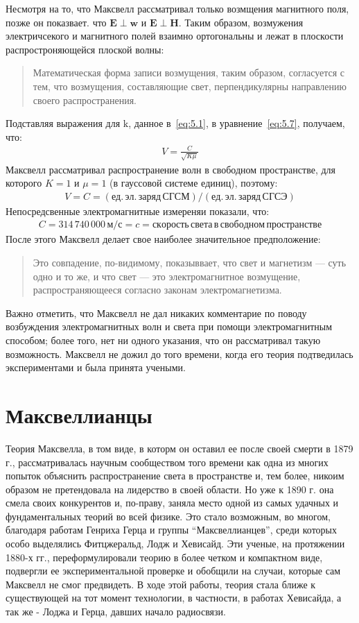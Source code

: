 \documentclass[12pt, oneside, a4paper]{article}
\begin{document}
Несмотря на то, что Максвелл рассматривал только возмщения магнитного поля, позже он показвает. что $\mathbf{E}\perp\mathbf{w}$ и $\mathbf{E}\perp\mathbf{H}$. Таким образом, возмужения электричсекого и магнитного полей  взаимно ортогональны и  лежат в плоскости распростроняющейся плоской волны:
\begin{quote}\small
Математическая форма записи возмущения, таким образом, согласуется с тем, что возмущения, составляющие свет, перпендикулярны направлению своего распространения.
\end{quote}
Подставляя выражения для $\mathrm{k}$, данное в~\eqref{eq:5.1}, в уравнение~\eqref{eq:5.7}, получаем, что:
\begin{align*}
V=\frac{C}{\sqrt{K\mu}}
\end{align*}
Максвелл рассматривал распространение волн в свободном пространстве, для которого $K=1$ и $\mu=1$ (в гауссовой системе единиц), поэтому:
\begin{align*}
V=C=(ед.\,эл.\,заряд\,СГСМ)/(ед.\,эл.\,заряд\,СГСЭ)
\end{align*}
Непосредсвенные электромагнитные измереняи показали, что:
\begin{align*}
C=314\,740\,000\, м/с=c=скорость\,света\,в\,свободном\,пространстве
\end{align*}
После этого Максвелл делает свое наиболее значительное предположение:
\begin{quote}
Это совпадение, по-видимому, показыввает, что свет и магнетизм --- суть одно и то же, и что свет --- это электромагнитное возмущение, распространяющееся согласно законам электромагнетизма.
\end{quote} 

Важно отметить, что Максвелл не дал никаких комментарие по поводу возбуждения электромагнитных волн и света при помощи электромагнитным способом; более того, нет ни одного указания, что он рассматривал такую возможность. Максвелл не дожил до того времени, когда его теория подтведилась экспериментами и была принята учеными. 
\section*{Максвеллианцы}
Теория Максвелла, в том виде, в которм он оставил ее после своей смерти в 1879 г., рассматривалась научным сообществом того времени как одна из многих попыток объяснить распространение света в пространстве и, тем более, никоим образом не претендовала на лидерство в своей области. Но уже к 1890 г. она смела своих конкурентов и, по-праву, заняла место одной из самых удачных и фундаментальных теорий во всей физике. Это стало возможным, во многом, благодаря работам Генриха Герца и группы ``Максвеллианцев'', среди которых особо выделялись Фитцжеральд, Лодж и Хевисайд. Эти ученые, на протяжении 1880-х гг., переформулировали теорию в более четком и компактном виде, подвергли ее экспериментальной проверке  и обобщили на случаи, которые сам Максвелл не смог предвидеть. В ходе этой работы, теория стала ближе к существующей на тот момент технологии, в частности, в работах Хевисайда, а так же - Лоджа и Герца, давших начало радиосвязи.
\end{document}
